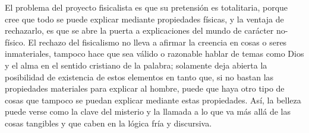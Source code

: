 \documentclass[]{book}
\begin{document}
\begin{refsection}
El problema del proyecto fisicalista es que su pretensión es
totalitaria, porque cree que todo se puede explicar mediante propiedades
físicas, y la ventaja de rechazarlo, es que se abre la puerta a
explicaciones del mundo de carácter no-físico. El rechazo del
fisicalismo no lleva a afirmar la creencia en cosas o seres
inmateriales, tampoco hace que sea válido o razonable hablar de temas
como Dios y el alma en el sentido cristiano de la palabra; solamente
deja abierta la posibilidad de existencia de estos elementos en tanto
que, si no bastan las propiedades materiales para explicar al hombre,
puede que haya otro tipo de cosas que tampoco se puedan explicar
mediante estas propiedades. Así, la belleza puede verse como la clave
del misterio y la llamada a lo que va más allá de las cosas tangibles y
que caben en la lógica fría y discursiva.


\nocite{BarriosRuiz2014}
\nocite{Dennett2003}
\nocite{Murray1979}
\nocite{Nagel1965}
\nocite{RomeraSF}

\printbibliography[heading=subbibliography,title={Referencias}]

\end{refsection}
\end{document}
